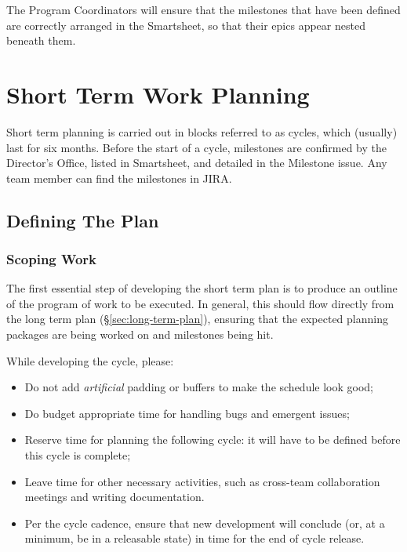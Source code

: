 The Program Coordinators will ensure that the milestones that have been defined are correctly arranged in the Smartsheet, so that their epics appear nested beneath them.


\section{Short Term Work Planning} \label{sec:cycle-plan}

Short term planning is carried out in blocks referred to as \glspl{cycle}, which (usually) last for six months.
Before the start of a \gls{cycle}, milestones are confirmed by the \gls{Director}'s Office, listed in Smartsheet, and detailed in the Milestone issue. Any team member can find the milestones in \gls{JIRA}.

\subsection{Defining The Plan}

\subsubsection{Scoping Work}

The first essential step of developing the short term plan is to produce an outline of the program of work to be executed.
In general, this should flow directly from the long term plan (\S\ref{sec:long-term-plan}), ensuring that the expected planning packages are being worked on and milestones being hit.

While developing the \gls{cycle}, please:

\begin{itemize}
\item Do not add \emph{artificial} padding or buffers to make the schedule look good;
\item Do budget appropriate time for handling bugs and emergent issues;
\item Reserve time for planning the following \gls{cycle}: it will have to be defined before this \gls{cycle} is complete;
\item Leave time for other necessary activities, such as cross-team collaboration meetings and writing documentation.
\item Per the \gls{cycle} \gls{cadence}, ensure that new development will conclude (or, at a minimum, be in a releasable state) in time for the end of \gls{cycle} release.
\end{itemize}


